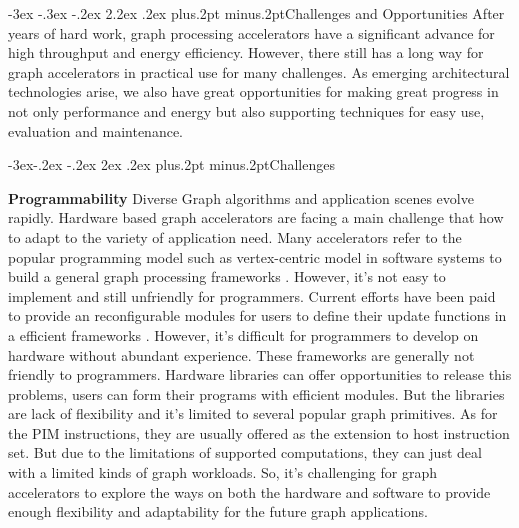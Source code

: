 \documentclass[twoside]{article}
\makeatletter
\def\section{\@startsection{section}{1}{\z@}%
 {-3ex \@plus -.3ex \@minus -.2ex}%
 {2.2ex \@plus.2ex}%
{\normalfont\normalsize\protect\baselineskip=14.5pt plus.2pt minus.2pt\bfseries}}
\def\subsection{\@startsection{subsection}{2}{\z@}%
 {-3ex\@plus -.2ex \@minus -.2ex}%
 {2ex \@plus.2ex}%
{\normalfont\normalsize\protect\baselineskip=12.5pt plus.2pt minus.2pt\bfseries}}
\makeatother
\begin{document}
\begin{multicols}{2}
\section{Challenges and Opportunities}
After years of hard work, graph processing accelerators have a significant advance for high throughput and energy efficiency. 
However, there still has a long way for graph accelerators in practical use for many challenges. As emerging architectural technologies arise, we also have great opportunities for making great progress in not only performance and energy but also supporting techniques for easy use, evaluation and maintenance.

\subsection{Challenges}

\textbf{Programmability} 
Diverse Graph algorithms and application scenes evolve rapidly. Hardware based graph accelerators are facing a main challenge that how to adapt to the variety of application need. Many accelerators refer to the popular programming model such as vertex-centric model in software systems to build a general graph processing frameworks \cite{engelhardt2016gravf}. However, it's not easy to implement and still unfriendly for programmers. Current efforts have been paid to provide an reconfigurable modules for users to define their update functions in a efficient frameworks \cite{zhou2017tunao}. However, it's difficult for programmers to develop on hardware without abundant experience. These frameworks are generally not friendly to programmers. Hardware libraries \cite{Oguntebi2016graphops} can offer opportunities to release this problems, users can form their programs with efficient modules. But the libraries are lack of flexibility and it's limited to several popular graph primitives. As for the PIM instructions, they are usually offered as the extension to host instruction set. But due to the limitations of supported computations, they can just deal with a limited kinds of graph workloads. So, it's challenging for graph accelerators to explore the ways on both the hardware and software to provide enough flexibility and adaptability for the future graph applications. 


\end{multicols}
\end{document}
